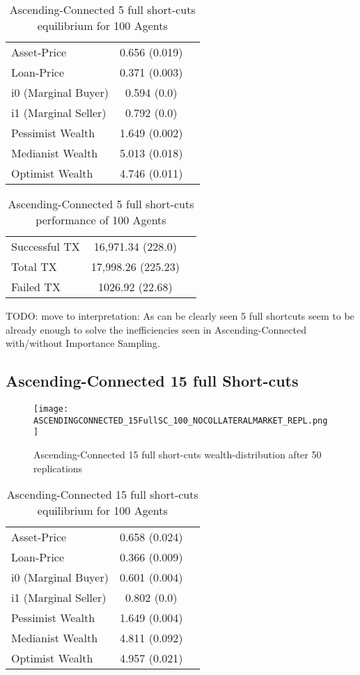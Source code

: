 \documentclass[Bachelorarbeit.tex]{subfiles}
\begin{document}
\begin{table}[h]
	\caption{Ascending-Connected 5 full short-cuts equilibrium for 100 Agents}
	\centering
	\begin{tabular} { l c r }
		\hline
		Asset-Price & 0.656 (0.019) \\
		Loan-Price & 0.371 (0.003) \\
		i0 (Marginal Buyer) & 0.594 (0.0) \\
		i1 (Marginal Seller) & 0.792 (0.0) \\
		Pessimist Wealth & 1.649 (0.002) \\
		Medianist Wealth & 5.013 (0.018) \\
		Optimist Wealth & 4.746 (0.011) \\
		\hline
	\end{tabular}
\end{table} 

\begin{table}[h]
	\caption{Ascending-Connected 5 full short-cuts performance of 100 Agents}
	\centering
	\begin{tabular} { l c r }
		\hline
		Successful TX & 16,971.34 (228.0) \\
		Total TX & 17,998.26 (225.23) \\
		Failed TX & 1026.92 (22.68) \\
		\hline
	\end{tabular}
\end{table}

TODO: move to interpretation: As can be clearly seen 5 full shortcuts seem to be already enough to solve the inefficiencies seen in Ascending-Connected with/without Importance Sampling.

\subsection{Ascending-Connected 15 full Short-cuts }
\begin{figure}[!htbp]
	\centering
  \texttt{[image: ASCENDINGCONNECTED\_15FullSC\_100\_NOCOLLATERALMARKET\_REPL.png]}
	\caption{Ascending-Connected 15 full short-cuts wealth-distribution after 50 replications}
	\label{fig1}
\end{figure}

\begin{table}[h]
	\caption{Ascending-Connected 15 full short-cuts equilibrium for 100 Agents}
	\centering
	\begin{tabular} { l c r }
		\hline
		Asset-Price & 0.658 (0.024) \\
		Loan-Price & 0.366 (0.009) \\
		i0 (Marginal Buyer) & 0.601 (0.004) \\
		i1 (Marginal Seller) & 0.802 (0.0) \\
		Pessimist Wealth & 1.649 (0.004) \\
		Medianist Wealth & 4.811 (0.092) \\
		Optimist Wealth & 4.957 (0.021) \\
		\hline
	\end{tabular}
\end{table} 
\end{document}
